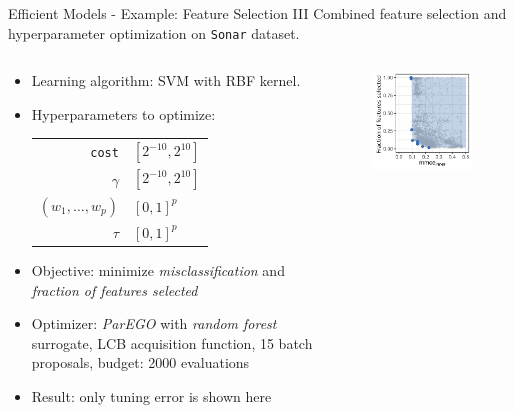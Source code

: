 \begin{frame}{Efficient Models - Example: Feature Selection III}
Combined feature selection and hyperparameter optimization on \texttt{Sonar} dataset.
\begin{columns}
\begin{column}{0.65\textwidth}
  \begin{itemize}
    \item Learning algorithm: SVM with RBF kernel.
    \item Hyperparameters to optimize: \\
    \begin{tabular}{rl}
    \texttt{cost} & $[2^{-10}, 2^{10}]$ \\
    $\gamma$ & $[2^{-10}, 2^{10}]$ \\
    $(w_1, \ldots, w_p)$ & $[0,1]^p$ \\
    $\tau$ & $[0,1]^p$ \\
    \end{tabular}
    \item Objective: minimize \emph{misclassification} and \emph{fraction of features selected}
    \item Optimizer: \emph{ParEGO} with \emph{random forest} surrogate, LCB acquisition function, 15 batch proposals, budget: 2000 evaluations
    \item Result: only tuning error is shown here
  \end{itemize}
\end{column}%
\begin{column}{0.35\textwidth}

  \begin{figure}
    \centering
    \includegraphics[width=\linewidth]{images/mosmafs_sonar_eval_domHV.pdf}
  \end{figure}

\end{column}
\end{columns}
\end{frame}


